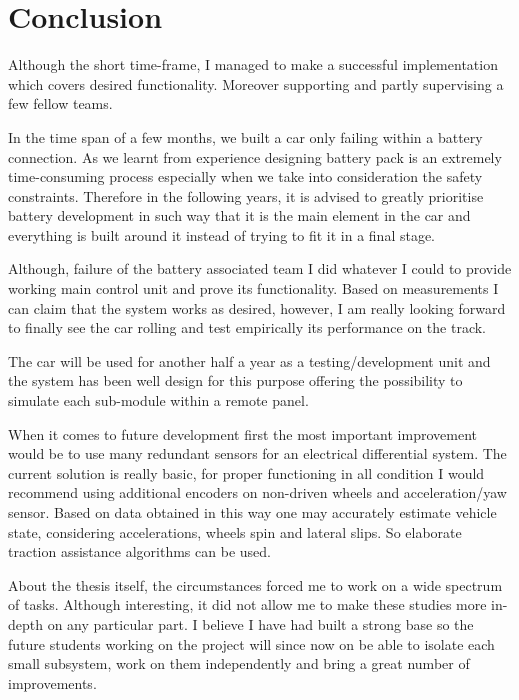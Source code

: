 \chapter{Conclusion}\label{total:chapters}
Although the short time-frame, I managed to make a successful implementation which covers desired functionality. Moreover supporting and partly supervising a few fellow teams. 

In the time span of a few months, we built a car only failing within a battery connection. As we learnt from experience designing battery pack is an extremely time-consuming process especially when we take into consideration the safety constraints. Therefore in the following years, it is advised to greatly prioritise battery development in such way that it is the main element in the car and everything is built around it instead of trying to fit it in a final stage.

Although, failure of the battery associated team I did whatever I could to provide working main control unit and prove its functionality. Based on measurements I can claim that the system works as desired, however, I am really looking forward to finally see the car rolling and test empirically its performance on the track.

The car will be used for another half a year as a testing/development unit and the system has been well design for this purpose offering the possibility to simulate each sub-module within a remote panel.

When it comes to future development first the most important improvement would be to use many redundant sensors for an electrical differential system. The current solution is really basic, for proper functioning in all condition I would recommend using additional encoders on non-driven wheels and acceleration/yaw sensor. Based on data obtained in this way one may accurately estimate vehicle state, considering accelerations, wheels spin and lateral slips. So elaborate traction assistance algorithms can be used.

About the thesis itself, the circumstances forced me to work on a wide spectrum of tasks. Although interesting, it did not allow me to make these studies more in-depth on any particular part. 
I believe I have had built a strong base so the future students working on the project will since now on be able to isolate each small subsystem, work on them independently and bring a great number of improvements.